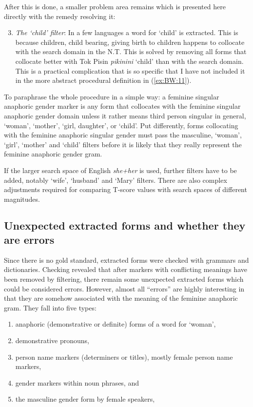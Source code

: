\documentclass[output=collectionpaper]{langsci/langscibook}
\begin{document}
After this is done, a smaller problem area remains which is presented here directly with the remedy resolving it:

\begin{enumerate}[label=(\roman*)]
\setcounter{enumi}{2}
\item
\emph{The ‘child’ filter}: In a few languages a word for ‘child’ is extracted. This is because children, child bearing, giving birth to children happens to collocate with the search domain in the N.T. This is solved by removing all forms that collocate better with Tok Pisin \textit{pikinini} ‘child’ than with the search domain. This is a practical complication that is so specific that I have not included it in the more abstract procedural definition in (\ref{ex:BW:11}).
\end{enumerate}

To paraphrase the whole procedure in a simple way: a feminine singular anaphoric gender marker is any form that collocates with the feminine singular anaphoric gender domain unless it rather means third person singular in general, ‘woman’, ‘mother’, ‘girl, daughter’, or ‘child’. Put differently, forms collocating with the feminine anaphoric singular gender must pass the masculine, ‘woman’, ‘girl’, ‘mother’ and ‘child’ filters before it is likely that they really represent the feminine anaphoric gender gram.

If the larger search space of English \textit{she+her} is used, further filters have to be added, notably ‘wife’, ‘husband’ and ‘Mary’ filters. There are also complex adjustments required for comparing T-score values with search spaces of different magnitudes.


\subsection{Unexpected extracted forms and whether they are errors}
\label{sec:BW:3.4}

Since there is no gold standard, extracted forms were checked with grammars and dictionaries. Checking revealed that after markers with conflicting meanings have been removed by filtering, there remain some unexpected extracted forms which could be considered errors. However, almost all “errors” are highly interesting in that they are somehow associated with the meaning of the feminine anaphoric gram. They fall into five types:

\begin{enumerate}[label=(\alph*)]
\item anaphoric (demonstrative or definite) forms of a word for ‘woman’,
\item demonstrative pronouns,
\item person name markers (determiners or titles), mostly female person name markers,
\item gender markers within noun phrases, and
\item the masculine gender form by female speakers,
\end{enumerate}
\end{document}
